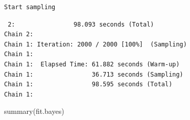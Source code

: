 \documentclass[
  letterpaper,
  DIV=11,
  numbers=noendperiod]{scrartcl}
\newenvironment{Shaded}{\begin{snugshade}}{\end{snugshade}}
\newcommand{\FunctionTok}[1]{\textcolor[rgb]{0.28,0.35,0.67}{#1}}
\newcommand{\NormalTok}[1]{\textcolor[rgb]{0.00,0.23,0.31}{#1}}
\begin{document}
\begin{verbatim}
Start sampling
\end{verbatim}

\begin{verbatim}
 2:                98.093 seconds (Total)
Chain 2: 
Chain 1: Iteration: 2000 / 2000 [100%]  (Sampling)
Chain 1: 
Chain 1:  Elapsed Time: 61.882 seconds (Warm-up)
Chain 1:                36.713 seconds (Sampling)
Chain 1:                98.595 seconds (Total)
Chain 1: 
\end{verbatim}

\begin{Shaded}
\begin{Highlighting}[]
\FunctionTok{summary}\NormalTok{(fit.bayes)}
\end{Highlighting}
\end{Shaded}
\end{document}
